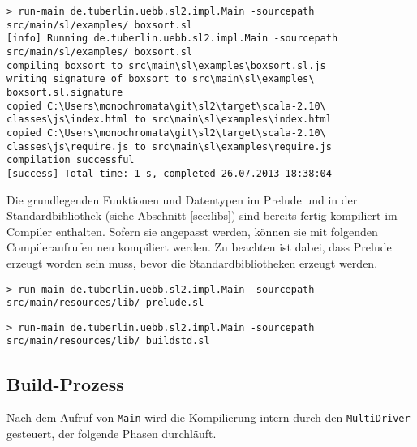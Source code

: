 \documentclass[runningheads]{llncs}
\begin{document}
\begin{verbatim}
> run-main de.tuberlin.uebb.sl2.impl.Main -sourcepath
src/main/sl/examples/ boxsort.sl
[info] Running de.tuberlin.uebb.sl2.impl.Main -sourcepath
src/main/sl/examples/ boxsort.sl
compiling boxsort to src\main\sl\examples\boxsort.sl.js
writing signature of boxsort to src\main\sl\examples\
boxsort.sl.signature
copied C:\Users\monochromata\git\sl2\target\scala-2.10\
classes\js\index.html to src\main\sl\examples\index.html
copied C:\Users\monochromata\git\sl2\target\scala-2.10\
classes\js\require.js to src\main\sl\examples\require.js
compilation successful
[success] Total time: 1 s, completed 26.07.2013 18:38:04
\end{verbatim}

Die grundlegenden Funktionen und Datentypen im Prelude und in der
Standardbibliothek (siehe Abschnitt \ref{sec:libs}) sind bereits
fertig kompiliert im Compiler enthalten. Sofern sie angepasst werden,
können sie mit folgenden Compileraufrufen neu kompiliert werden. Zu
beachten ist dabei, dass Prelude erzeugt worden sein muss, bevor die
Standardbibliotheken erzeugt werden.

\begin{verbatim}
> run-main de.tuberlin.uebb.sl2.impl.Main -sourcepath
src/main/resources/lib/ prelude.sl
\end{verbatim}

\begin{verbatim}
> run-main de.tuberlin.uebb.sl2.impl.Main -sourcepath
src/main/resources/lib/ buildstd.sl
\end{verbatim}

\subsection{Build-Prozess}
\label{sec:compBuild}

Nach dem Aufruf von \texttt{Main} wird die Kompilierung intern durch
den \texttt{MultiDriver} gesteuert, der folgende Phasen durchläuft.
\end{document}
